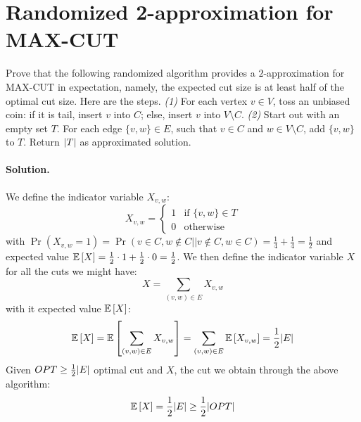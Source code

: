 \section{Randomized 2-approximation for MAX-CUT}

Prove  that  the  following  randomized algorithm provides a $2$-approximation for MAX-CUT in expectation, namely, the expected cut size is at least half of the optimal cut size.
Here are the steps.
\emph{(1)} For each vertex $v \in V$,  toss  an  unbiased  coin:  if  it  is  tail, insert $v$ into $C$; else, insert $v$ into $V \setminus C$.
\emph{(2)} Start out with an empty set $T$.
For each edge $\{v, w\} \in E$, such that $v \in C$ and $w \in V \setminus C$, add $\{v, w\}$ to $T$.
Return $\lvert T\rvert$ as approximated solution.

\vspace{0.5cm}
\paragraph{Solution.}
We define the indicator variable $X_{v, w}$:
\begin{equation*}
X_{v, w} =   \begin{cases}
            1   & \text{if } \{v, w\} \in T \\
            0   & \text{otherwise}
            \end{cases}
\end{equation*}
with $\Pr(X_{v, w} = 1) = \Pr(v \in C, w \notin C || v \notin C, w \in C) = \frac{1}{4} + \frac{1}{4} = \frac{1}{2}$ and expected value $\mathbb{E}\left[{X}\right] = \frac{1}{2} \cdot 1 + \frac{1}{2} \cdot 0 = \frac{1}{2}$.
We then define the indicator variable $X$ for all the cuts we might have:
\begin{equation*}
X = \sum_{(v, w) \in E} X_{v, w}
\end{equation*}
with it expected value $\mathbb{E}\left[{X}\right]$:
\begin{equation*}
\mathbb{E}\left[{X}\right] = \mathbb{E}\left[{\sum_{(v, w) \in E} X_{v, w}}\right] = \sum_{(v, w) \in E} \mathbb{E}\left[{X_{v, w}}\right] = \frac{1}{2} \lvert E\rvert
\end{equation*}
Given $OPT \geq \frac{1}{2} \lvert E\rvert$ optimal cut and $X$, the cut we obtain through the above algorithm:
\begin{equation*}
\mathbb{E}\left[{X}\right] = \frac{1}{2} \lvert E\rvert \geq \frac{1}{2} \lvert OPT\rvert
\end{equation*}